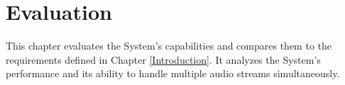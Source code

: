 \chapter{Evaluation}

\label{Evaluation}

This chapter evaluates the System's capabilities and compares them to the requirements defined in Chapter 
\ref{Introduction}. It analyzes the System's performance and its ability to handle multiple audio streams 
simultaneously.

